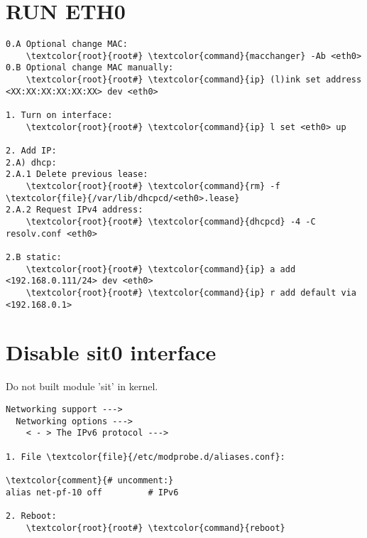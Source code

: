 \documentclass[10pt, a4paper, onecolumn, openany]{book}         %
\begin{document}
\section{RUN ETH0}
\begin{Verbatim}[commandchars=\\\{\}]
0.A Optional change MAC:
    \textcolor{root}{root#} \textcolor{command}{macchanger} -Ab <eth0>
0.B Optional change MAC manually:
    \textcolor{root}{root#} \textcolor{command}{ip} (l)ink set address <XX:XX:XX:XX:XX:XX> dev <eth0>
    
1. Turn on interface:
    \textcolor{root}{root#} \textcolor{command}{ip} l set <eth0> up

2. Add IP:
2.A) dhcp:
2.A.1 Delete previous lease:
    \textcolor{root}{root#} \textcolor{command}{rm} -f \textcolor{file}{/var/lib/dhcpcd/<eth0>.lease}
2.A.2 Request IPv4 address:
    \textcolor{root}{root#} \textcolor{command}{dhcpcd} -4 -C resolv.conf <eth0>

2.B static:
    \textcolor{root}{root#} \textcolor{command}{ip} a add <192.168.0.111/24> dev <eth0>
    \textcolor{root}{root#} \textcolor{command}{ip} r add default via <192.168.0.1>
\end{Verbatim}


\section{Disable sit0 interface}
Do not built module 'sit' in kernel.
\begin{Verbatim}[commandchars=\\\{\}]
Networking support --->
  Networking options --->
    < - > The IPv6 protocol --->

1. File \textcolor{file}{/etc/modprobe.d/aliases.conf}:

\textcolor{comment}{# uncomment:}
alias net-pf-10 off         # IPv6

2. Reboot:
    \textcolor{root}{root#} \textcolor{command}{reboot}
\end{Verbatim}
\end{document}
